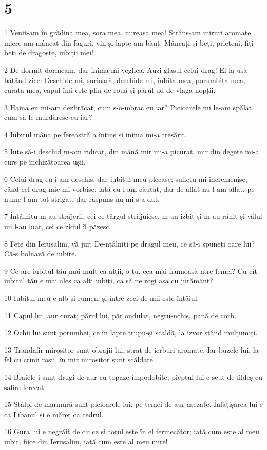 \chapter{5}

\par 1 Venit-am în grădina mea, sora mea, mireasa mea! Strâns-am miruri aromate, miere am mâncat din faguri, vin și lapte am băut. Mâncați și beți, prieteni, fiți beți de dragoste, iubiții mei!
\par 2 De dormit dormeam, dar inima-mi veghea. Auzi glasul celui drag! El la ușă bătând zice: Deschide-mi, surioară, deschide-mi, iubita mea, porumbița mea, curata mea, capul îmi este plin de rouă și părul ud de vlaga nopții.
\par 3 Haina eu mi-am dezbrăcat, cum s-o-mbrac eu iar? Picioarele mi le-am spălat, cum să le murdăresc eu iar?
\par 4 Iubitul mâna pe fereastră a întins și inima mi-a tresărit.
\par 5 Iute să-i deschid m-am ridicat, din mână mir mi-a picurat, mir din degete mi-a curs pe închizătoarea ușii.
\par 6 Celui drag eu i-am deschis, dar iubitul meu plecase; sufletu-mi încremenise, când cel drag mie-mi vorbise; iată eu l-am căutat, dar de-aflat nu l-am aflat; pe nume l-am tot strigat, dar răspuns nu mi s-a dat.
\par 7 Întâlnitu-m-au străjerii, cei ce târgul străjuiesc, m-au izbit și m-au rănit și vălul mi l-au luat, cei ce zidul îl păzesc.
\par 8 Fete din Ierusalim, vă jur: De-ntâlniți pe dragul meu, ce să-i spuneți oare lui? Că-s bolnavă de iubire.
\par 9 Ce are iubitul tău mai mult ca alții, o tu, cea mai frumoasă-ntre femei? Cu cît iubitul tău e mai ales ca alți iubiți, ca să ne rogi așa cu jurământ?
\par 10 Iubitul meu e alb și rumen, și între zeci de mii este întâiul.
\par 11 Capul lui, aur curat; părul lui, păr ondulat, negru-nchis, pană de corb.
\par 12 Ochii lui sunt porumbei, ce în lapte trupu-și scaldă, la izvor stând mulțumiți.
\par 13 Trandafir mirositor sunt obrajii lui, strat de ierburi aromate. Iar buzele lui, la fel cu crinii roșii, în mir mirositor sunt scăldate.
\par 14 Braiele-i sunt drugi de aur cu topaze împodobite; pieptul lui e scut de fildeș cu safire ferecat.
\par 15 Stâlpi de marmură sunt picioarele lui, pe temei de aur așezate. Înfățișarea lui e ca Libanul și e măreț ca cedrul.
\par 16 Gura lui e negrăit de dulce și totul este în el fermecător; iată cum este al meu iubit, fiice din Ierusalim, iată cum este al meu mire!

